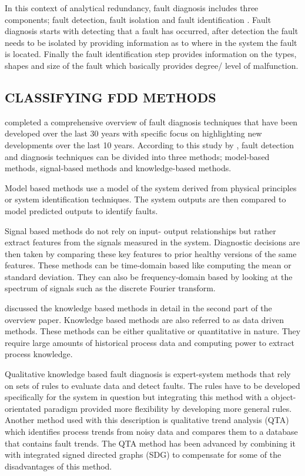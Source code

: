 In this context of analytical redundancy, fault diagnosis includes three components; fault detection, fault isolation and fault identification \cite{gao2015survey}. Fault diagnosis starts with detecting that a fault has occurred, after detection the fault needs to be isolated by providing information as to where in the system the fault is located. Finally the fault identification step provides information on the types, shapes and size of the fault which basically provides degree/ level of malfunction.

\subsection{CLASSIFYING FDD METHODS}

\cite{gao2015survey} completed a comprehensive overview of fault diagnosis techniques that have been developed over the last 30 years with specific focus on highlighting new developments over the last 10 years. According to this study by \cite{gao2015survey}, fault detection and diagnosis techniques can be divided into three methods; model-based methods, signal-based methods and knowledge-based methods.

Model based methods use a model of the system derived from physical principles or system identification techniques. The system outputs are then compared to model predicted outputs to identify faults.

Signal based methods do not rely on input- output relationships but rather extract features from the signals measured in the system. Diagnostic decisions are then taken by comparing these key features to prior healthy versions of the same features. These methods can be time-domain based like computing the mean or standard deviation. They can also be frequency-domain based by looking at the spectrum of signals such as the discrete Fourier transform.

\cite{cecati2015survey} discussed the knowledge based methods in detail in the second part of the overview paper. Knowledge based methods are also referred to as data driven methods. These methods can be either qualitative or quantitative in nature. They require large amounts of historical process data and computing power to extract process knowledge. 

Qualitative knowledge based fault diagnosis is expert-system methods that rely on sets of rules to evaluate data and detect faults. The rules have to be developed specifically for the system in question but integrating this method with a object-orientated paradigm provided more flexibility by developing more general rules. Another method used with this description is qualitative trend analysis (QTA) which identifies process trends from noisy data and compares them to a database that contains fault trends. The QTA method has been advanced by combining it with integrated signed directed graphs (SDG) to compensate for some of the disadvantages of this method.

